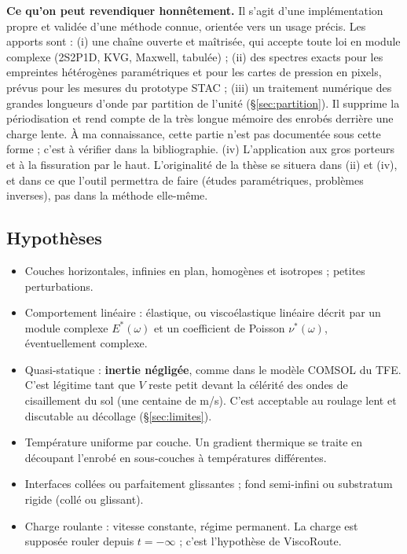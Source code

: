 \documentclass[11pt,a4paper]{article}
\begin{document}
\begin{encadre}
\textbf{Ce qu'on peut revendiquer honnêtement.} Il s'agit d'une implémentation propre et
validée d'une méthode connue, orientée vers un usage précis. Les apports sont :
(i) une chaîne ouverte et maîtrisée, qui accepte toute loi en module complexe (2S2P1D, KVG,
Maxwell, tabulée) ; (ii) des spectres exacts pour les empreintes hétérogènes paramétriques et pour
les cartes de pression en pixels, prévus pour les mesures du prototype STAC ; (iii) un traitement
numérique des grandes longueurs d'onde par partition de l'unité (\S\ref{sec:partition}). Il supprime
la périodisation et rend compte de la très longue mémoire des enrobés derrière une charge lente.
À ma connaissance, cette partie n'est pas documentée sous cette forme ; c'est à vérifier dans la
bibliographie. (iv) L'application aux gros porteurs et à la fissuration par le haut. L'originalité
de la thèse se situera dans (ii) et (iv), et dans ce que l'outil permettra de faire (études
paramétriques, problèmes inverses), pas dans la méthode elle-même.
\end{encadre}

\subsection{Hypothèses}
\begin{itemize}[nosep]
  \item Couches horizontales, infinies en plan, homogènes et isotropes ; petites perturbations.
  \item Comportement linéaire : élastique, ou viscoélastique linéaire décrit par un module complexe
        $E^*(\omega)$ et un coefficient de Poisson $\nu^*(\omega)$, éventuellement complexe.
  \item Quasi-statique : \textbf{inertie négligée}, comme dans le modèle COMSOL du TFE. C'est
        légitime tant que $V$ reste petit devant la célérité des ondes de cisaillement du sol
        (une centaine de m/s). C'est acceptable au roulage lent et discutable au décollage (\S\ref{sec:limites}).
  \item Température uniforme par couche. Un gradient thermique se traite en découpant l'enrobé en
        sous-couches à températures différentes.
  \item Interfaces collées ou parfaitement glissantes ; fond semi-infini ou substratum rigide
        (collé ou glissant).
  \item Charge roulante : vitesse constante, régime permanent. La charge est supposée rouler depuis
        $t=-\infty$ ; c'est l'hypothèse de ViscoRoute.
\end{itemize}
\end{document}
